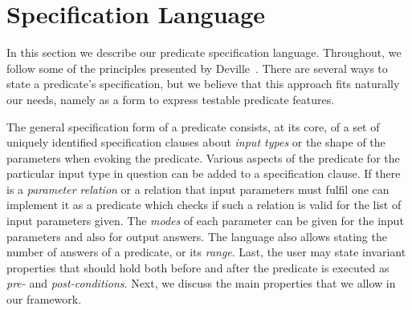 
\section{Specification Language}
\label{sec:pred-spec}

In this section we describe our predicate specification language.
%
Throughout, we follow some of the principles presented
by Deville~\cite{Deville1990logprog}.
%
There are several ways to state a predicate's specification, %
but we
 believe that this approach fits naturally our needs, namely as a
form to express testable predicate features. %


The general specification form of a predicate  consists, at its
core, of a set of uniquely identified specification clauses
 about \emph{input types} or the shape of the parameters when evoking the predicate.
%
%
Various aspects of the predicate for the particular input type in
question can be added to a specification clause.
%
If there is
a \emph{parameter relation} or
 a relation that input parameters must fulfil one can implement it
as a predicate %
which checks if such a relation is
valid for the list of input parameters given.
%
The \emph{modes} of each parameter can be given for the input parameters and also
for  output answers.
%
The language also allows stating the number of
answers of a predicate,
or its \emph{range}.
%
Last, the user may state invariant properties that should hold both
before and after the predicate is executed as \emph{pre-} and \emph{post-conditions}.
%
Next, we discuss the main properties that we allow in our framework.

